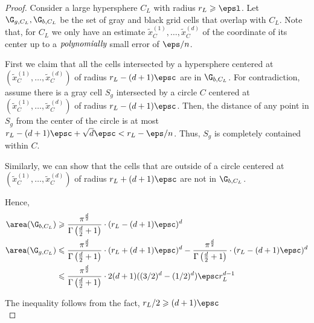 	\begin{proof}
		Consider a large hypersphere \(C_L\) with radius \(r_L\geqslant\epsl\). Let \(\G_{g, C_L},\G_{b, C_L}\) be the set of gray and black grid cells that overlap with \(C_L\). Note that, for \(C_L\) we only have an estimate \(\tilde{x}_{C}^{(1)},\dots,\tilde{x}_{C}^{(d)}\) of the coordinate of its center up to a \(\emph{polynomially}\) small error of \(\eps/n\).
		
		First we claim that all the cells intersected by a hypersphere centered at  \((\tilde{x}_{C}^{(1)},\dots,\tilde{x}_{C}^{(d)})\) of radius $r_L- (d+1)\epsc$ are in $\G_{b, C_L}$. 
		For contradiction, assume there is a gray cell $S_g$ intersected by a circle $C$ centered at  \((\tilde{x}_{C}^{(1)},\dots,\tilde{x}_{C}^{(d)})\) of radius $r_L- (d+1)\epsc$.
		Then, the distance of any point in $S_g$ from the center of the circle is at most $r_L- (d+1)\epsc +\sqrt{d}\epsc < r_L-\eps/n$. Thus, $S_g$  is completely contained within $C$.
		
		Similarly, we can show that the cells that are outside of a circle centered at  \((\tilde{x}_{C}^{(1)},\dots,\tilde{x}_{C}^{(d)})\) of radius $r_L+ (d+1)\epsc$ are not in $\G_{b, C_L}$.
		
		Hence, 
		\begin{align*}
		\area(\G_{b, C_L}) &\geqslant \frac{\pi^{\frac{d}{2}}}{\Gamma\left(\frac{d}{2} + 1\right)} \cdot (r_L-(d+1)\epsc)^d \\
		\area(\G_{g, C_L}) &\leqslant \frac{\pi^{\frac{d}{2}}}{\Gamma\left(\frac{d}{2} + 1\right)} \cdot (r_L+(d+1)\epsc)^d - \frac{\pi^{\frac{d}{2}}}{\Gamma\left(\frac{d}{2} + 1\right)} \cdot (r_L-(d+1)\epsc)^d \\ 
		&\leqslant \frac{\pi^{\frac{d}{2}}}{\Gamma\left(\frac{d}{2} + 1\right)} \cdot 2(d+1)((3/2)^d-(1/2)^d)\epsc r_{L}^{d-1}
		\end{align*}

		The inequality follows from the fact, \(r_{L}/2\geqslant(d+1)\epsc\)\\
		

\end{proof}
